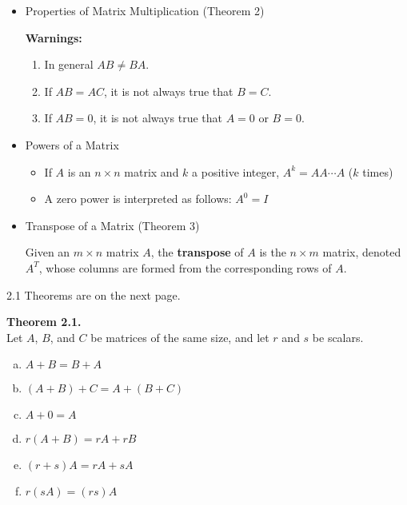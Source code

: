 \documentclass[10pt]{book}
\newenvironment{boxthm}{\begin{mdframed}[backgroundcolor=gray!30,nobreak=true]}{\end{mdframed}}
\newenvironment{boxdef}{\begin{mdframed}[backgroundcolor=gray!30,linewidth=0pt,nobreak=true]}{\end{mdframed}}
\begin{document}
\begin{itemize}
\begin{itemize}
		\end{itemize}
	\item Properties of Matrix Multiplication (Theorem 2)
		\begin{boxdef}
			\textbf{Warnings:}
			\begin{enumerate}
				\item In general $AB\neq BA$.
				\item If $AB=AC$, it is not always true that $B=C$.
				\item If $AB=0$, it is not always true that $A=0$ or $B=0$.
			\end{enumerate}
		\end{boxdef}
	\item Powers of a Matrix
		\begin{itemize}
			\item If $A$ is an $n\times n$ matrix and $k$ a positive integer, $A^k=AA\cdots A$ ($k$ times)
			\item A zero power is interpreted as follows: $A^0=I$
		\end{itemize}
	\item Transpose of a Matrix (Theorem 3)
		\begin{boxdef}
			Given an $m\times n$ matrix $A$, the \textbf{transpose} of $A$ is the $n\times m$ matrix, denoted $A^T$, whose columns are formed from the corresponding rows of $A$.
		\end{boxdef}
\end{itemize}

\vfill
\hfill
2.1 Theorems are on the next page.
\newpage


\begin{boxthm}
	\textbf{Theorem 2.1.} \\
	Let $A$, $B$, and $C$ be matrices of the same size, and let $r$ and $s$ be scalars.
	\setlength\multicolsep{0pt}
	\begin{multicols}{2}
		\begin{enumerate}[(a)]
			\item $A+B=B+A$
			\item $(A+B)+C = A+(B+C)$
			\item $A+0=A$
			\item $r(A+B)=rA+rB$
			\item $(r+s)A=rA+sA$
			\item $r(sA)=(rs)A$
		\end{enumerate}
	\end{multicols}
\end{boxthm}
\end{document}
